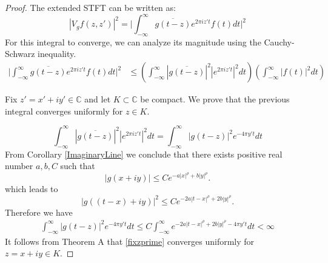 \documentclass[graybox]{svmult}
\newcommand{\C}{\mathbb{C}}
\begin{document}
\begin{proof}
The extended STFT can be written as:
\begin{equation*}
    |V_gf(z,z')|^2 = \Bigg|\int_{-\infty}^{\infty} \overline{g(t -z)} e^{2\pi i z' t} f(t) dt\Bigg|^2 
\end{equation*}
For this integral to converge, we can analyze its magnitude using the Cauchy-Schwarz inequality. 
\begin{align*}
    \Bigg|\int_{-\infty}^{\infty} \overline{g(t -z)} e^{2\pi i z' t} f(t) dt\Bigg|^2
    &\le \left( \int_{-\infty}^{\infty} |\overline{g(t-z)}|^2 |e^{2\pi i z' t}|^2 dt \right) \left( \int_{-\infty}^{\infty} |f(t)|^2 dt \right)
\end{align*}

Fix $z'=x'+iy'\in \C$ and let $K\subset \C$ be compact. We prove that the previous integral converges uniformly for $z\in K$.


\begin{equation}\label{fixzprime}
    \int_{-\infty}^{\infty} |\overline{g(t-z)}|^2 |e^{2\pi iz't}|^2 dt = \int_{-\infty}^{\infty}|g(t-z)|^2e^{-4\pi y't}dt 
\end{equation}
From Corollary \ref{ImaginaryLine} we conclude that there exists positive real number $a,b,C$ such that 
\begin{equation*}
    |g(x+iy)| \leq Ce^{-a|x|^{\rho}+b|y|^{\rho}}.
\end{equation*}
which leads to
\begin{equation*}
    |g((t-x)+iy)|^2 \leq Ce^{-2a|t-x|^{\rho}+2b|y|^{\rho}}.
\end{equation*}
Therefore we have
\begin{align*}
\int_{-\infty}^{\infty}|g(t-z)|^2e^{-4\pi y't}dt \leq C\int_{-\infty}^{\infty}e^{-2a|t-x|^{\rho}+2b|y|^{\rho}-4\pi y't}dt<\infty
\end{align*}
It follows from Theorem A that \eqref{fixzprime} converges uniformly for $z=x+iy\in K$.


\end{proof}
\end{document}
